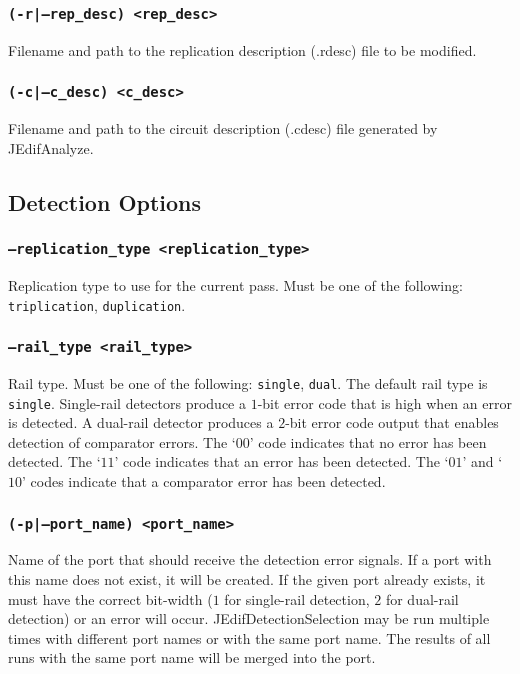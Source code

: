 \subsubsection{\texttt{(-r|--rep\_desc) <rep\_desc>}}
Filename and path to the replication description (.rdesc) file to be modified.

\subsubsection{\texttt{(-c|--c\_desc) <c\_desc>}}
Filename and path to the circuit description (.cdesc) file generated by
JEdifAnalyze.

\subsection{Detection Options}

\subsubsection{\texttt{--replication\_type <replication\_type>}}
Replication type to use for the current pass. Must be one of the following:
\texttt{triplication}, \texttt{duplication}.

\subsubsection{\texttt{--rail\_type <rail\_type>}}
Rail type. Must be one of the following: \texttt{single}, \texttt{dual}. The
default rail type is \texttt{single}. Single-rail detectors produce a $1$-bit
error code that is high when an error is detected. A dual-rail detector produces
a $2$-bit error code output that enables detection of comparator errors. The
`\texttt{$00$}' code indicates that no error has been detected. The
`\texttt{$11$}' code indicates that an error has been detected. The
`\texttt{$01$}' and `\texttt{$10$}' codes indicate that a comparator error has
been detected.

\subsubsection{\texttt{(-p|--port\_name) <port\_name>}}
Name of the port that should receive the detection error signals. If a port
with this name does not exist, it will be created. If the given port already
exists, it must have the correct bit-width ($1$ for single-rail detection, $2$
for dual-rail detection) or an error will occur. JEdifDetectionSelection may be
run multiple times with different port names or with the same port name. The
results of all runs with the same port name will be merged into the port.

